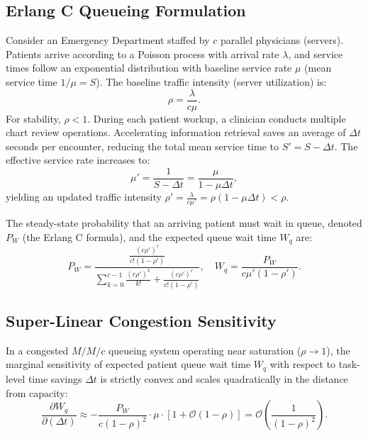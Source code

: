 \documentclass[ijds,dblanonrev]{informs4}
\begin{document}
\subsection{Erlang C Queueing Formulation}
Consider an Emergency Department staffed by $c$ parallel physicians (servers). Patients arrive according to a Poisson process with arrival rate $\lambda$, and service times follow an exponential distribution with baseline service rate $\mu$ (mean service time $1/\mu = S$). The baseline traffic intensity (server utilization) is:
\begin{equation}
  \rho = \frac{\lambda}{c \mu}.
  \label{eq:traffic_intensity}
\end{equation}
For stability, $\rho < 1$. During each patient workup, a clinician conducts multiple chart review operations. Accelerating information retrieval saves an average of $\Delta t$ seconds per encounter, reducing the total mean service time to $S' = S - \Delta t$. The effective service rate increases to:
\begin{equation}
  \mu' = \frac{1}{S - \Delta t} = \frac{\mu}{1 - \mu \Delta t},
  \label{eq:updated_mu}
\end{equation}
yielding an updated traffic intensity $\rho' = \frac{\lambda}{c \mu'} = \rho (1 - \mu \Delta t) < \rho$.

The steady-state probability that an arriving patient must wait in queue, denoted $P_W$ (the Erlang C formula), and the expected queue wait time $W_q$ are:
\begin{equation}
  P_W = \frac{\frac{(c \rho')^c}{c!(1-\rho')}}{\sum_{k=0}^{c-1} \frac{(c \rho')^k}{k!} + \frac{(c \rho')^c}{c!(1-\rho')}}, \quad W_q = \frac{P_W}{c \mu' (1 - \rho')}.
  \label{eq:erlang_c_formula}
\end{equation}

\subsection{Super-Linear Congestion Sensitivity}

\begin{theorem}
\label{thm:queue_sensitivity}
In a congested $M/M/c$ queueing system operating near saturation ($\rho \to 1$), the marginal sensitivity of expected patient queue wait time $W_q$ with respect to task-level time savings $\Delta t$ is strictly convex and scales quadratically in the distance from capacity:
\begin{equation}
  \frac{\partial W_q}{\partial (\Delta t)} \approx -\frac{P_W}{c (1 - \rho)^2} \cdot \mu \cdot \left[ 1 + \mathcal{O}(1 - \rho) \right] = \mathcal{O}\left( \frac{1}{(1 - \rho)^2} \right).
  \label{eq:sensitivity_derivative}
\end{equation}
\end{theorem}
\end{document}
